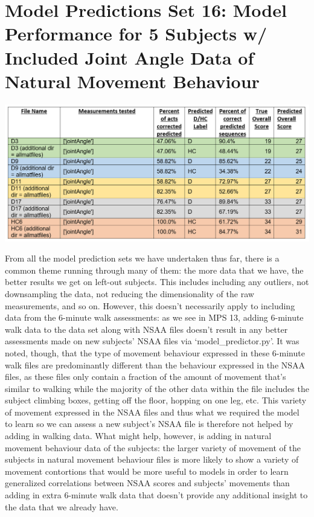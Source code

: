 \documentclass[12pt,twoside]{report}
\begin{document}
\section{Model Predictions Set 16: Model Performance for 5 Subjects w/ Included Joint Angle Data of Natural Movement Behaviour}

\begin{center}
\includegraphics[scale=0.4]{project_figures/fig11_23}
\end{center}


\quad From all the model prediction sets we have undertaken thus far, there is a common theme running through many of them: the more data that we have, the better results we get on left-out subjects. This includes including any outliers, not downsampling the data, not reducing the dimensionality of the raw measurements, and so on. However, this doesn’t necessarily apply to including data from the 6-minute walk assessments: as we see in MPS 13, adding 6-minute walk data to the data set along with NSAA files doesn’t result in any better assessments made on new subjects’ NSAA files via ‘model\_predictor.py’. It was noted, though, that the type of movement behaviour expressed in these 6-minute walk files are predominantly different than the behaviour expressed in the NSAA files, as these files only contain a fraction of the amount of movement that’s similar to walking while the majority of the other data within the file includes the subject climbing boxes, getting off the floor, hopping on one leg, etc. This variety of movement expressed in the NSAA files and thus what we required the model to learn so we can assess a new subject’s NSAA file is therefore not helped by adding in walking data. What might help, however, is adding in natural movement behaviour data of the subjects: the larger variety of movement of the subjects in natural movement behaviour files is more likely to show a variety of movement contortions that would be more useful to models in order to learn generalized correlations between NSAA scores and subjects’ movements than adding in extra 6-minute walk data that doesn’t provide any additional insight to the data that we already have.\\
\end{document}
